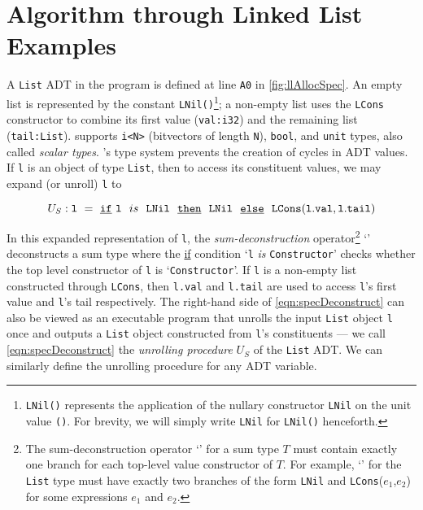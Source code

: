 \section{Algorithm through Linked List Examples}
\label{sec:examples}
A {\tt List} ADT in the
\SpecL{} program is defined at line {\tt A0}
in \cref{fig:llAllocSpec}. An empty list is represented
by the
constant {\tt LNil()}\footnote{{\tt LNil()} represents the application
of the nullary constructor {\tt LNil} on the unit value {\tt ()}. For brevity,
we will simply write {\tt LNil} for {\tt LNil()} henceforth.};
a non-empty list uses
the {\tt LCons} constructor to combine its first value ({\tt val:i32})
and the remaining list ({\tt tail:List}).
\SpecL{} supports
{\tt i<N>} (bitvectors of length {\tt N}),
{\tt bool}, and {\tt unit} types, also called {\em scalar types}.
\SpecL{}'s type system prevents
the creation of cycles in ADT values.
If {\tt l} is
an object of type {\tt List}, then to access its
constituent values, we may expand (or unroll) {\tt l} to
\begin{small}
\begin{equation}\label{eqn:specDeconstruct}
U_S: {\tt l\ =\ \underline{if}\ l}\ \ is\ \ {\tt LNil\ \ \underline{then}\ \ LNil\ \ \underline{else}\ \ LCons(l.val,l.tail)}
\end{equation}
\end{small}
In this expanded representation of {\tt l},
the {\em sum-deconstruction} operator\footnote{The sum-deconstruction operator `\sumDtor{}' for a sum type $T$ must contain exactly one branch for each top-level value constructor of $T$.
For example, `\sumDtor{}' for the {\tt List} type must have exactly two branches of the form {\tt LNil} and {\tt LCons}($e_1$,$e_2$) for some expressions $e_1$ and $e_2$.}
`\sumDtor{}'
deconstructs a sum type where the
\underline{if} condition `{\tt l} {\em is} {\tt Constructor}'
checks whether the top level constructor of {\tt l} is `{\tt Constructor}'.
If {\tt l}
is a non-empty list constructed through {\tt LCons},
then {\tt l.val} and {\tt l.tail}
are used to access {\tt l}'s first value and {\tt l}'s tail respectively.
The right-hand side of
\cref{eqn:specDeconstruct} can also be viewed as an executable
program that unrolls the input {\tt List} object {\tt l} once and
outputs a {\tt List} object constructed from {\tt l}'s constituents --- we
call \cref{eqn:specDeconstruct} the {\em unrolling procedure} $U_S$ of the {\tt List} ADT.
We can similarly define the unrolling procedure for any ADT variable.



